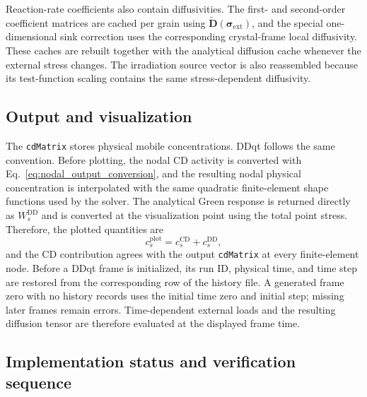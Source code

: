 \documentclass[10pt]{article}
\begin{document}
Reaction-rate coefficients also contain diffusivities.  The first- and
second-order coefficient matrices are cached per grain using
$\widetilde{\boldsymbol{D}}(\boldsymbol{\sigma}_{\mathrm{ext}})$, and the
special one-dimensional sink correction uses the corresponding crystal-frame
local diffusivity.  These caches are rebuilt together with the analytical
diffusion cache whenever the external stress changes.  The irradiation source
vector is also reassembled because its test-function scaling contains the same
stress-dependent diffusivity.

\subsection{Output and visualization}

The \texttt{cdMatrix} stores physical mobile concentrations.  DDqt follows
the same convention.  Before plotting, the nodal CD activity is converted
with Eq.~\eqref{eq:nodal_output_conversion}, and the resulting nodal physical
concentration is interpolated with the same quadratic finite-element shape
functions used by the solver.  The analytical Green response is returned
directly as $W_s^{\mathrm{DD}}$ and is converted at the visualization point
using the total point stress.  Therefore, the plotted quantities are
\begin{equation}
    c_s^{\mathrm{plot}}
    =
    c_s^{\mathrm{CD}}
    +
    c_s^{\mathrm{DD}},
\end{equation}
and the CD contribution agrees with the output \texttt{cdMatrix} at every
finite-element node.
Before a DDqt frame is initialized, its run ID, physical time, and time step are
restored from the corresponding row of the history file.  A generated frame
zero with no history records uses the initial time zero and initial step;
missing later frames remain errors.  Time-dependent
external loads and the resulting diffusion tensor are therefore evaluated at
the displayed frame time.

\subsection{Implementation status and verification sequence}
\end{document}
